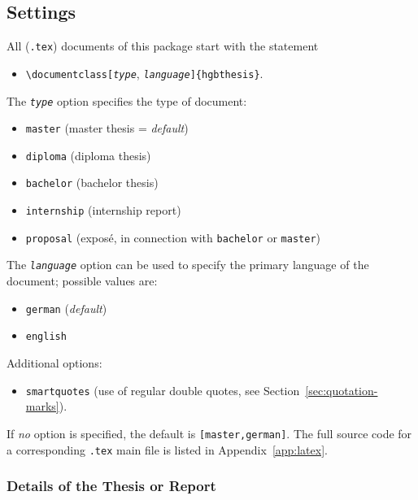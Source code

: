 \subsection{Settings}
\label{sec:hagenberg-settings}

All (\verb!.tex!) documents of this package start with the statement
%
\begin{itemize}
    \item[] \verb!\documentclass[!\texttt{\emph{type}},
    \texttt{\emph{language}}\verb!]{hgbthesis}!.
\end{itemize}
%
The \texttt{\emph{type}} option specifies the type of document:
%
\begin{itemize}
    \item[] \texttt{master} (master thesis = \emph{default})
    \item[] \texttt{diploma} (diploma thesis)
    \item[] \texttt{bachelor} (bachelor thesis)
    \item[] \texttt{internship} (internship report)
	\item[] \texttt{proposal} (exposé, in connection with \texttt{bachelor} or
	\texttt{master})
\end{itemize}
%
The \texttt{\emph{language}} option can be used to specify the primary language
of the document; possible values are:
%
\begin{itemize}
    \item[] \texttt{german} (\emph{default})
    \item[] \texttt{english}
\end{itemize}
%
Additional options:
%
\begin{itemize}
    \item[] \texttt{smartquotes} (use of regular double quotes, see
    Section~\ref{sec:quotation-marks}).
\end{itemize}
%
If \emph{no} option is specified, the default is \texttt{[master,german]}. The
full source code for a corresponding \verb!.tex! main file is listed in
Appendix~\ref{app:latex}.

\subsubsection{Details of the Thesis or Report}

